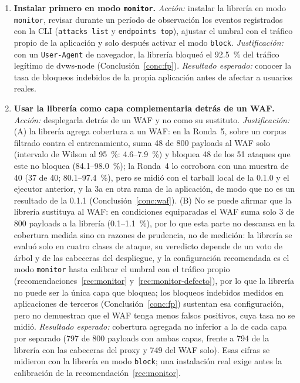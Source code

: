 \begin{enumerate}
        \item \label{rec:monitor}\textbf{Instalar primero en modo \texttt{monitor}.} \textit{Acción:} instalar la librería
    en modo \texttt{monitor}, revisar durante un período de observación los eventos registrados con
    la CLI (\texttt{attacks list} y \texttt{endpoints top}), ajustar el umbral con el tráfico propio
    de la aplicación y solo después activar el modo \texttt{block}. \textit{Justificación:} con un
    \texttt{User-Agent} de navegador, la librería bloqueó el 92.5~\% del tráfico legítimo de
    dvws-node (Conclusión~\ref{conc:fp}). \textit{Resultado esperado:} conocer la tasa de bloqueos
    indebidos de la propia aplicación antes de afectar a usuarios reales.

    \item \textbf{Usar la librería como capa complementaria detrás de un WAF.}
    \textit{Acción:} desplegarla detrás de un WAF y no como su sustituto. \textit{Justificación:}
    (A) la librería agrega cobertura a un WAF: en la Ronda~5, sobre un corpus filtrado contra el
    entrenamiento, suma 48 de 800 payloads al WAF solo (intervalo de Wilson al 95~\%: 4.6--7.9~\%) y
    bloquea 48 de los 51 ataques que este no bloquea (84.1--98.0~\%); la Ronda~4 lo corrobora con una
    muestra de 40 (37 de 40; 80.1--97.4~\%), pero se midió con el tarball local de la 0.1.0 y el
    ejecutor anterior, y la 3a en otra rama de la aplicación, de modo que no es un resultado de la 0.1.1 (Conclusión~\ref{conc:waf}). (B) No se
    puede afirmar que la librería sustituya al WAF: en condiciones equiparadas el WAF suma solo 3 de
    800 payloads a la librería (0.1--1.1~\%), por lo que esta parte no descansa en la cobertura
    medida sino en razones de prudencia, no de medición: la librería se evaluó solo en cuatro clases
    de ataque, su veredicto depende de un voto de árbol y de las cabeceras del despliegue, y la
    configuración recomendada es el modo \texttt{monitor} hasta calibrar el umbral con el tráfico
    propio (recomendaciones~\ref{rec:monitor} y~\ref{rec:monitor-defecto}), por lo que la librería
    no puede ser la única capa que bloquea; los bloqueos indebidos medidos en aplicaciones de
    terceros (Conclusión~\ref{conc:fp}) sustentan esa configuración, pero no demuestran que el WAF
    tenga menos falsos positivos, cuya tasa no se midió. \textit{Resultado esperado:} cobertura
    agregada no inferior a la de cada capa por separado (797 de 800 payloads con ambas capas, frente
    a 794 de la librería con las cabeceras del proxy y 749 del WAF solo). Esas cifras se midieron con
    la librería en modo \texttt{block}; una instalación real exige antes la calibración de la
    recomendación~\ref{rec:monitor}.


\end{enumerate}
